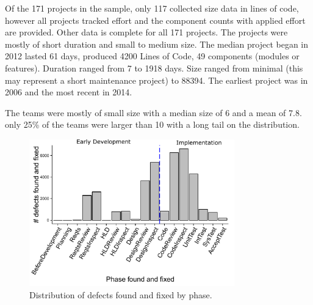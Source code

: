 \documentclass[smallcondensed]{svjour3}
\begin{document}
 
 Of the 171 projects in the sample, only 117 collected size data in lines of code, however all projects tracked effort and  the component counts with applied effort are provided. Other data is complete for all 171 projects. The projects were mostly of short duration and small to medium size. The median project began in 2012 lasted 61 days, produced 4200 Lines of Code, 49 components (modules or features). Duration ranged from 7 to 1918 days. Size ranged from minimal (this may represent a short maintenance project) to 88394. The earliest project was in 2006 and the most recent in 2014. 
 
 The teams were mostly of small size with a median size of 6 and a mean of 7.8. only 25\% of the teams were larger than 10 with a long tail on the distribution. 
  


\begin{figure}[!t] 
\vspace{0.5cm}
\begin{center}
\includegraphics[height=2.5in]{img/fix-phase-dist.pdf}
\end{center} 
\caption{Distribution of defects found and fixed by phase.}
\label{fig:fix-phase-dist}
\end{figure}
\end{document}
